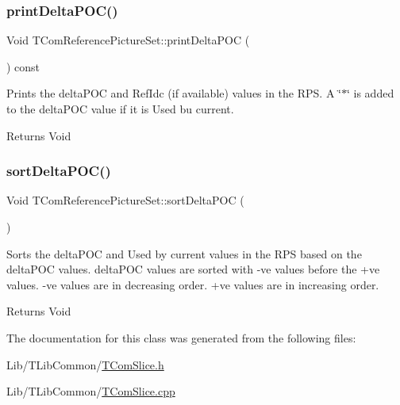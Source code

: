 \subsubsection{\texorpdfstring{print\+Delta\+P\+O\+C()}{printDeltaPOC()}}
{\footnotesize\ttfamily Void T\+Com\+Reference\+Picture\+Set\+::print\+Delta\+P\+OC (\begin{DoxyParamCaption}{ }\end{DoxyParamCaption}) const}

Prints the delta\+P\+OC and Ref\+Idc (if available) values in the R\+PS. A \char`\"{}$\ast$\char`\"{} is added to the delta\+P\+OC value if it is Used bu current. \begin{DoxyReturn}{Returns}
Void 
\end{DoxyReturn}
\mbox{\label{class_t_com_reference_picture_set_a471d8a5c5c33e6d576f0831e6ee53db9}} 
\subsubsection{\texorpdfstring{sort\+Delta\+P\+O\+C()}{sortDeltaPOC()}}
{\footnotesize\ttfamily Void T\+Com\+Reference\+Picture\+Set\+::sort\+Delta\+P\+OC (\begin{DoxyParamCaption}{ }\end{DoxyParamCaption})}

Sorts the delta\+P\+OC and Used by current values in the R\+PS based on the delta\+P\+OC values. delta\+P\+OC values are sorted with -\/ve values before the +ve values. -\/ve values are in decreasing order. +ve values are in increasing order. \begin{DoxyReturn}{Returns}
Void 
\end{DoxyReturn}


The documentation for this class was generated from the following files\+:\begin{DoxyCompactItemize}
\item 
Lib/\+T\+Lib\+Common/\hyperlink{_t_com_slice_8h}{T\+Com\+Slice.\+h}\item 
Lib/\+T\+Lib\+Common/\hyperlink{_t_com_slice_8cpp}{T\+Com\+Slice.\+cpp}\end{DoxyCompactItemize}
